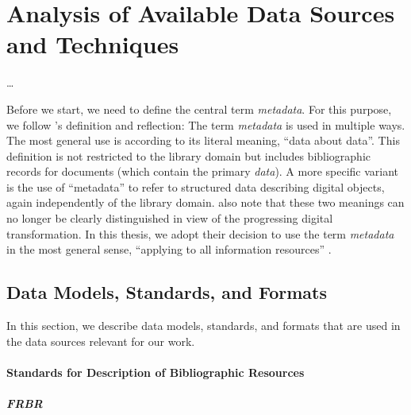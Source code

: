 \chapter{Analysis of Available Data Sources and Techniques}
\label{chap:analysis}


\dots

Before we start, we need to define the central term \emph{metadata}.
For this purpose, we follow \citeauthor{Hider2008}'s \autocite*{Hider2008} definition and reflection:
The term \emph{metadata} is used in multiple ways.
The most general use is according to its literal meaning, \enquote{data about data}.
This definition is not restricted to the library domain
but includes bibliographic records for documents (which contain the primary \emph{data}).
A more specific variant is the use of \enquote{metadata} to refer to
structured data describing digital objects,
again independently of the library domain. \citeauthor{Hider2008} also note that
these two meanings can no longer be clearly distinguished in view of the
progressing digital transformation. In this thesis, we adopt their
decision to use the term \emph{metadata} in the most general sense,
\enquote{applying to all information resources} \autocite[p.13]{Hider2008}.


\section{Data Models, Standards, and Formats}
\label{sec:data_models}


In this section, we describe data models, standards, and formats that are used in the data sources
relevant for our work. 

\subsubsection{Standards for Description of Bibliographic Resources}

\paragraph{FRBR}

